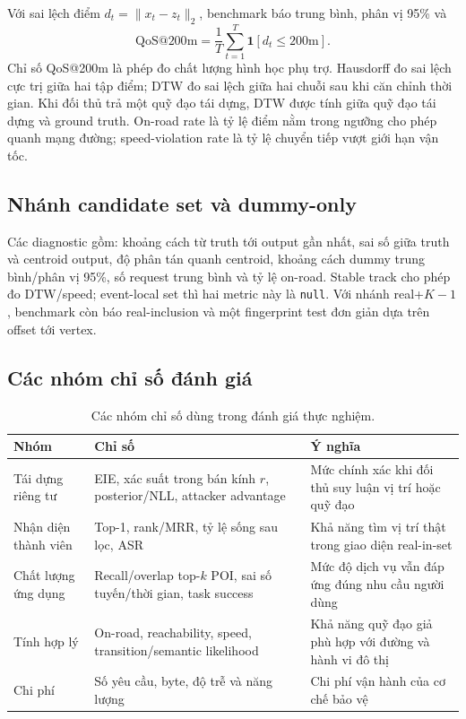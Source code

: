 \documentclass[12pt,a4paper,oneside]{report}
\begin{document}
Với sai lệch điểm $d_t=\|x_t-z_t\|_2$, benchmark báo trung bình, phân vị 95\% và
\[
\mathrm{QoS@200m}=\frac{1}{T}\sum_{t=1}^{T}\mathbf 1[d_t\le 200\mathrm{m}].
\]
Chỉ số QoS@200m là phép đo chất lượng hình học phụ trợ. Hausdorff đo sai lệch cực trị giữa hai tập điểm; DTW đo sai lệch giữa hai chuỗi sau khi căn chỉnh thời gian. Khi đối thủ trả một quỹ đạo tái dựng, DTW được tính giữa quỹ đạo tái dựng và ground truth. On-road rate là tỷ lệ điểm nằm trong ngưỡng cho phép quanh mạng đường; speed-violation rate là tỷ lệ chuyển tiếp vượt giới hạn vận tốc.

\subsection{Nhánh candidate set và dummy-only}

Các diagnostic gồm: khoảng cách từ truth tới output gần nhất, sai số giữa truth và centroid output, độ phân tán quanh centroid, khoảng cách dummy trung bình/phân vị 95\%, số request trung bình và tỷ lệ on-road. Stable track cho phép đo DTW/speed; event-local set thì hai metric này là \texttt{null}. Với nhánh real+$K-1$, benchmark còn báo real-inclusion và một fingerprint test đơn giản dựa trên offset tới vertex.

\subsection{Các nhóm chỉ số đánh giá}

\begin{table}[htbp]
\centering
\small
\caption{Các nhóm chỉ số dùng trong đánh giá thực nghiệm.}
\label{tab:metric-status}
\begin{tabularx}{\textwidth}{P{3.0cm}P{4.0cm}Y}
\toprule
\textbf{Nhóm} & \textbf{Chỉ số} & \textbf{Ý nghĩa} \\
\midrule
Tái dựng riêng tư & EIE, xác suất trong bán kính $r$, posterior/NLL, attacker advantage & Mức chính xác khi đối thủ suy luận vị trí hoặc quỹ đạo \\
Nhận diện thành viên & Top-1, rank/MRR, tỷ lệ sống sau lọc, ASR & Khả năng tìm vị trí thật trong giao diện real-in-set \\
Chất lượng ứng dụng & Recall/overlap top-$k$ POI, sai số tuyến/thời gian, task success & Mức độ dịch vụ vẫn đáp ứng đúng nhu cầu người dùng \\
Tính hợp lý & On-road, reachability, speed, transition/semantic likelihood & Khả năng quỹ đạo giả phù hợp với đường và hành vi đô thị \\
Chi phí & Số yêu cầu, byte, độ trễ và năng lượng & Chi phí vận hành của cơ chế bảo vệ \\
\bottomrule
\end{tabularx}
\end{table}
\end{document}
